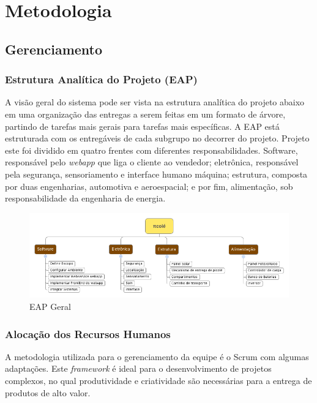 \chapter{Metodologia}
\section{Gerenciamento}

\subsection{Estrutura Analítica do Projeto (EAP)}

A visão geral do sistema pode ser vista na estrutura analítica do projeto abaixo em uma organização das entregas a serem feitas em um formato de árvore, partindo de tarefas mais gerais para tarefas mais específicas. A EAP está estruturada com os entregáveis de cada subgrupo no decorrer do projeto. Projeto este foi dividido em quatro frentes com diferentes responsabilidades. Software, responsável pelo \textit{webapp} que liga o cliente ao vendedor; eletrônica, responsável pela segurança, sensoriamento e interface humano máquina; estrutura, composta por duas engenharias, automotiva e aeroespacial; e por fim, alimentação, sob responsabilidade da engenharia de energia.  

\begin{figure}[H]
	\centering
    \includegraphics[width=\textwidth]{figuras/EAP_Geral}
    \caption{EAP Geral}
    \label{fig:EAP_Geral}
\end{figure}

\subsection{Alocação dos Recursos Humanos}
A metodologia utilizada para o gerenciamento da equipe é o Scrum com algumas adaptações. Este \textit{framework} é ideal para o desenvolvimento de projetos complexos, no qual produtividade e criatividade são necessárias para a entrega de produtos de alto valor.

